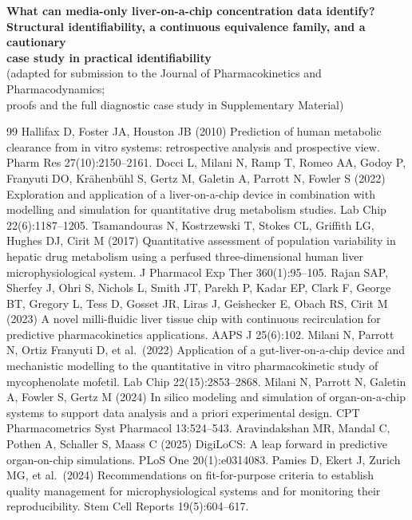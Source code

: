\documentclass[11pt]{article}
\begin{document}
\begin{center}
{\large\bfseries What can media-only liver-on-a-chip concentration data identify?\\[2pt]
Structural identifiability, a continuous equivalence family, and a cautionary\\
case study in practical identifiability}\\[6pt]
{\small (adapted for submission to the Journal of Pharmacokinetics and Pharmacodynamics;\\
proofs and the full diagnostic case study in Supplementary Material)}
\end{center}










\begin{thebibliography}{99}
 Hallifax D, Foster JA, Houston JB (2010) Prediction of human metabolic clearance from in vitro systems: retrospective analysis and prospective view. Pharm Res 27(10):2150--2161.
 Docci L, Milani N, Ramp T, Romeo AA, Godoy P, Franyuti DO, Kr{\"a}henb{\"u}hl S, Gertz M, Galetin A, Parrott N, Fowler S (2022) Exploration and application of a liver-on-a-chip device in combination with modelling and simulation for quantitative drug metabolism studies. Lab Chip 22(6):1187--1205.
 Tsamandouras N, Kostrzewski T, Stokes CL, Griffith LG, Hughes DJ, Cirit M (2017) Quantitative assessment of population variability in hepatic drug metabolism using a perfused three-dimensional human liver microphysiological system. J Pharmacol Exp Ther 360(1):95--105.
 Rajan SAP, Sherfey J, Ohri S, Nichols L, Smith JT, Parekh P, Kadar EP, Clark F, George BT, Gregory L, Tess D, Gosset JR, Liras J, Geishecker E, Obach RS, Cirit M (2023) A novel milli-fluidic liver tissue chip with continuous recirculation for predictive pharmacokinetics applications. AAPS J 25(6):102.
 Milani N, Parrott N, Ortiz Franyuti D, et al.\ (2022) Application of a gut-liver-on-a-chip device and mechanistic modelling to the quantitative in vitro pharmacokinetic study of mycophenolate mofetil. Lab Chip 22(15):2853--2868.
 Milani N, Parrott N, Galetin A, Fowler S, Gertz M (2024) In silico modeling and simulation of organ-on-a-chip systems to support data analysis and a priori experimental design. CPT Pharmacometrics Syst Pharmacol 13:524--543.
 Aravindakshan MR, Mandal C, Pothen A, Schaller S, Maass C (2025) DigiLoCS: A leap forward in predictive organ-on-chip simulations. PLoS One 20(1):e0314083.
 Pamies D, Ekert J, Zurich MG, et al.\ (2024) Recommendations on fit-for-purpose criteria to establish quality management for microphysiological systems and for monitoring their reproducibility. Stem Cell Reports 19(5):604--617.
\end{thebibliography}
\end{document}
